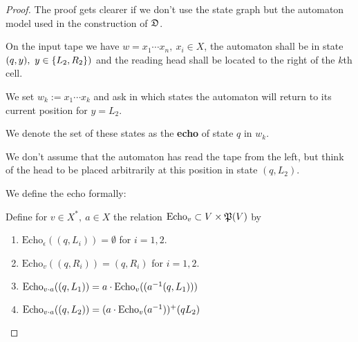 \begin{proof}
The proof gets clearer if we don't use the state graph but the automaton model
used in the construction of $\mbox{$\mathfrak{D}$}$.

\missingfigure

On the input tape we have $w = x_1 \cdots x_n,\ x_i \in X$, the automaton shall
be in state $(q, y),\ y \in \mbox{$\{L_2, R_2\}$})$ and the reading head shall be
located to the right of the $k$th cell.

We set $w_k := x_1 \cdots x_k$ and ask in which states the automaton will return
to its current position for $y = L_2$.

We denote the set of these states as the {\bf echo} of state $q$ in $w_k$.

We don't assume that the automaton has read the tape from the left, but think of
the head to be placed arbitrarily at this position in state $(q, L_2)$.

We define the echo formally:
\newcommand{\echo}[2]{\mathrm{Echo}_{#1}(#2)}

Define for $v \in X^*,\ a \in X$ the relation $\mathrm{Echo}_v \subset V \times
\mathfrak{P}({V})$ by
\begin{enumerate}
  \item $\echo{\epsilon}{(q, L_i)} = \emptyset$ for $i = 1, 2$.
  
  \item $\echo{v}{(q, R_i)} = (q, R_i)$ for $i = 1, 2$.
  
  \item $\echo{v \cdot a}{(q, L_1)} = a \cdot \echo{v}{(\inv{a}(q, L_1))}$
  
  \item $\echo{v \cdot a}{(q, L_2)} = (a \cdot \echo{v}{\inv{a}})^+ (q L_2)$
\end{enumerate}

\end{proof}






























